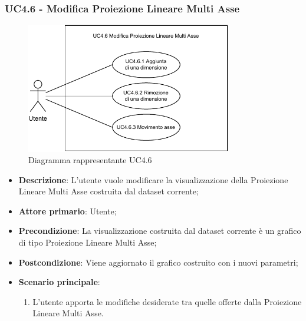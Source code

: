 \newpage
\subsubsection{UC4.6 - Modifica Proiezione Lineare Multi Asse}
\label{ssub:uc4.6}
\begin{figure}[h]
    \centering
    \includegraphics[width=0.8\textwidth]{componenti/casi-duso/diagrammi/UC4_6.pdf}
    \caption{Diagramma rappresentante UC4.6}
    \label{fig:UC4.6}
\end{figure}

\begin{itemize}
    \item \textbf{Descrizione}: L’utente vuole modificare la visualizzazione della Proiezione Lineare Multi Asse
                                costruita dal dataset corrente;

    \item \textbf{Attore primario}: Utente;

    \item \textbf{Precondizione}:   La visualizzazione costruita dal dataset corrente è un grafico di tipo Proiezione Lineare Multi Asse;
    \item \textbf{Postcondizione}:  Viene aggiornato il grafico costruito con i nuovi parametri;

	\item \textbf{Scenario principale}:
		\begin{enumerate}
            \item L'utente apporta le modifiche desiderate tra quelle offerte dalla Proiezione Lineare Multi Asse.
        \end{enumerate}
\end{itemize}

